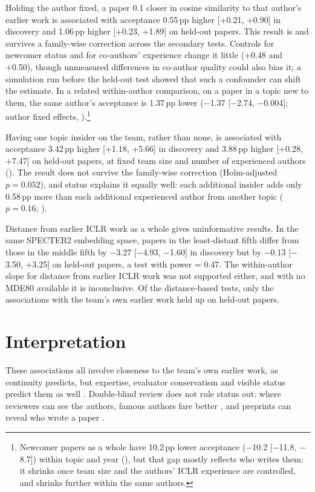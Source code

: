 Holding the author fixed, a paper 0.1 closer in cosine similarity to that author's earlier work is associated with
acceptance 0.55\,pp higher [+0.21, +0.90] in discovery and 1.06\,pp higher [+0.23, +1.89] on held-out papers. This
result is  and survives a family-wise correction across the secondary tests. Controls for
newcomer status and for co-authors' experience change it little (+0.48 and +0.50), though unmeasured differences in
co-author quality could also bias it; a simulation run before the held-out test showed that such a confounder can
shift the estimate. In a related within-author comparison, on a paper in a topic new to them, the same author's
acceptance is 1.37\,pp lower ($-$1.37 [$-$2.74, $-$0.004]; author fixed effects, ).\footnote{Newcomer
papers as a whole have 10.2\,pp lower acceptance ($-$10.2 [$-$11.8, $-$8.7]) within topic and year
(), but that gap mostly reflects who writes them: it shrinks once team size and the authors' ICLR
experience are controlled, and shrinks further within the same authors.}

Having one topic insider on the team, rather than none, is associated with acceptance 3.42\,pp higher [+1.18, +5.66] in
discovery and 3.88\,pp higher [+0.28, +7.47] on held-out papers, at fixed team size and number of experienced authors
(). The result does not survive the family-wise correction (Holm-adjusted $p = 0.052$), and
status explains it equally well: each additional insider adds only 0.58\,pp more than each additional experienced
author from another topic ($p = 0.16$; ).

Distance from earlier ICLR work as a whole gives uninformative results. In the same SPECTER2 embedding space, papers in
the least-distant fifth differ from those in the middle fifth by $-$3.27 [$-$4.93, $-$1.60] in discovery but by $-$0.13
[$-$3.50, +3.25] on held-out papers, a test with power = 0.47. The within-author slope for distance from earlier ICLR
work was not supported either, and with no MDE80 available it is inconclusive. Of the distance-based tests, only the
associations with the team's own earlier work held up on held-out papers.

\section{Interpretation}
These associations all involve closeness to the team's own earlier work, as continuity predicts, but expertise,
evaluator conservatism and visible status predict them as well \citep{li2017expertise,merton1968matthew}. Double-blind
review does not rule status out: where reviewers can see the authors, famous authors fare better
\citep{tomkins2017reviewer}, and preprints can reveal who wrote a paper \citep{bharadhwaj2020deanonymization}.


